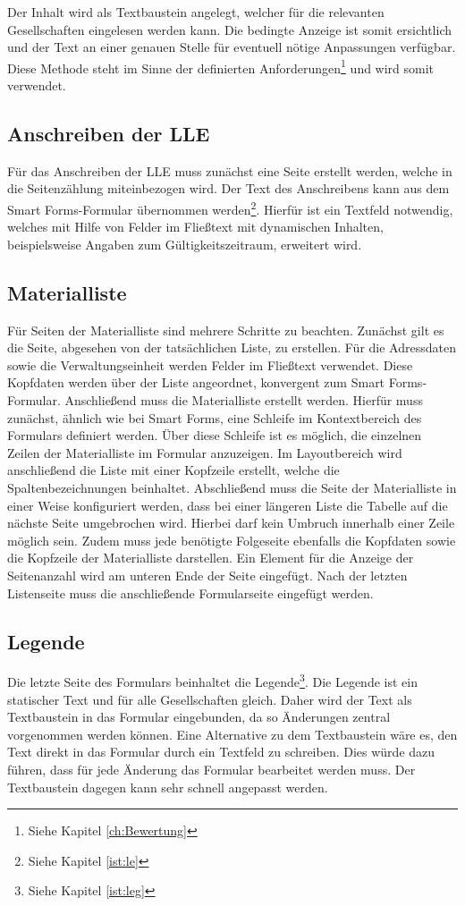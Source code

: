 Der Inhalt wird als Textbaustein angelegt, welcher für die relevanten Gesellschaften eingelesen werden kann. Die bedingte Anzeige ist somit ersichtlich und der Text an einer genauen Stelle für eventuell nötige Anpassungen verfügbar.
Diese Methode steht im Sinne der definierten Anforderungen\footnote{Siehe Kapitel \ref{ch:Bewertung}} und wird somit verwendet. 

\subsection{Anschreiben der \acs{LLE}}

Für das Anschreiben der \ac{LLE} muss zunächst eine Seite erstellt werden, welche in die Seitenzählung miteinbezogen wird. Der Text des Anschreibens kann aus dem Smart Forms-Formular übernommen werden\footnote{Siehe Kapitel \ref{ist:le}}. Hierfür ist ein Textfeld notwendig, welches mit Hilfe von Felder im Fließtext mit dynamischen Inhalten, beispielsweise Angaben zum Gültigkeitszeitraum, erweitert wird. 

\subsection{Materialliste}

Für Seiten der Materialliste sind mehrere Schritte zu beachten. Zunächst gilt es die Seite, abgesehen von der tatsächlichen Liste, zu erstellen. Für die Adressdaten sowie die Verwaltungseinheit werden Felder im Fließtext verwendet. Diese Kopfdaten werden über der Liste angeordnet, konvergent zum Smart Forms-Formular. Anschließend muss die Materialliste erstellt werden. Hierfür muss zunächst, ähnlich wie bei Smart Forms, eine Schleife im Kontextbereich des Formulars definiert werden. Über diese Schleife ist es möglich, die einzelnen Zeilen der Materialliste im Formular anzuzeigen. Im Layoutbereich wird anschließend die Liste mit einer Kopfzeile  erstellt, welche die Spaltenbezeichnungen beinhaltet. Abschließend muss die Seite der Materialliste in einer Weise konfiguriert werden, dass bei einer längeren Liste die Tabelle auf die nächste Seite umgebrochen wird. Hierbei darf kein Umbruch innerhalb einer Zeile möglich sein. Zudem muss jede benötigte Folgeseite ebenfalls die Kopfdaten sowie die Kopfzeile der Materialliste darstellen. Ein Element für die Anzeige der Seitenanzahl wird am unteren Ende der Seite eingefügt. Nach der letzten Listenseite muss die anschließende Formularseite eingefügt werden.

\subsection{Legende}
Die letzte Seite des Formulars beinhaltet die Legende\footnote{Siehe Kapitel \ref{ist:leg}}.
Die Legende ist ein statischer Text und für alle Gesellschaften gleich. Daher wird der Text als Textbaustein in das Formular eingebunden, da so Änderungen zentral vorgenommen werden können. Eine Alternative zu dem Textbaustein wäre es, den Text direkt in das Formular durch ein Textfeld zu schreiben. Dies würde dazu führen, dass für jede Änderung das Formular bearbeitet werden muss. Der Textbaustein dagegen kann sehr schnell angepasst werden.



